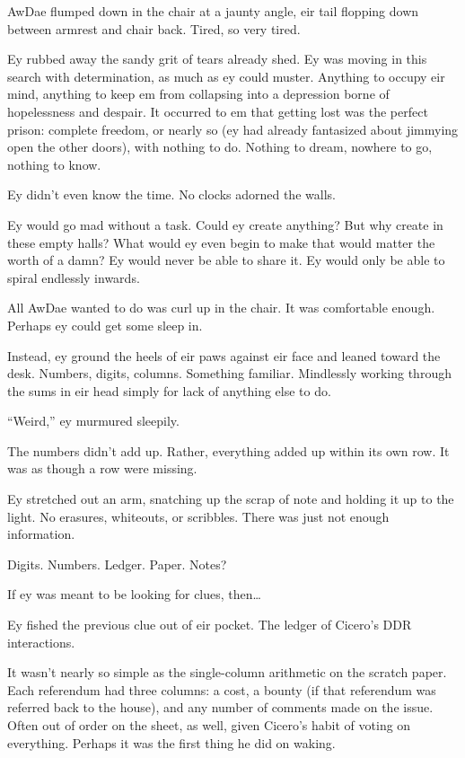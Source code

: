 AwDae flumped down in the chair at a jaunty angle, eir tail flopping down between armrest and chair back. Tired, so very tired.

Ey rubbed away the sandy grit of tears already shed. Ey was moving in this search with determination, as much as ey could muster. Anything to occupy eir mind, anything to keep em from collapsing into a depression borne of hopelessness and despair. It occurred to em that getting lost was the perfect prison: complete freedom, or nearly so (ey had already fantasized about jimmying open the other doors), with nothing to do. Nothing to dream, nowhere to go, nothing to know.

Ey didn't even know the time. No clocks adorned the walls.

Ey would go mad without a task. Could ey create anything? But why create in these empty halls? What would ey even begin to make that would matter the worth of a damn? Ey would never be able to share it. Ey would only be able to spiral endlessly inwards.

All AwDae wanted to do was curl up in the chair. It was comfortable enough. Perhaps ey could get some sleep in.

Instead, ey ground the heels of eir paws against eir face and leaned toward the desk. Numbers, digits, columns. Something familiar. Mindlessly working through the sums in eir head simply for lack of anything else to do.

``Weird,'' ey murmured sleepily.

The numbers didn't add up. Rather, everything added up within its own row. It was as though a row were missing.

Ey stretched out an arm, snatching up the scrap of note and holding it up to the light. No erasures, whiteouts, or scribbles. There was just not enough information.

Digits. Numbers. Ledger. Paper. Notes?

If ey was meant to be looking for clues, then\ldots{}

Ey fished the previous clue out of eir pocket. The ledger of Cicero's DDR interactions.

It wasn't nearly so simple as the single-column arithmetic on the scratch paper. Each referendum had three columns: a cost, a bounty (if that referendum was referred back to the house), and any number of comments made on the issue. Often out of order on the sheet, as well, given Cicero's habit of voting on everything. Perhaps it was the first thing he did on waking.

